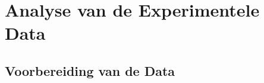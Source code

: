 \chapter{Analyse van de Experimentele Data}
\label{ch:analyse}


\section{Voorbereiding van de Data}

